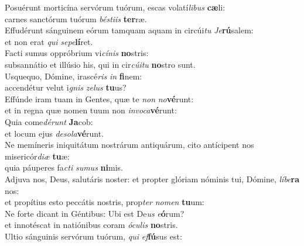 \evenverse Posuérunt morticína servórum tuórum, escas volatí\textit{li}\textit{bus} \textbf{cæ}li:~\*\\
\evenverse carnes sanctórum tuórum \textit{bé}\textit{sti}\textit{is} \textbf{ter}ræ.\\
\oddverse Effudérunt sánguinem eórum tamquam aquam in circúi\textit{tu} \textit{Je}\textbf{rú}salem:~\*\\
\oddverse et non erat \textit{qui} \textit{se}\textit{pe}\textbf{lí}ret.\\
\evenverse Facti sumus oppróbrium vi\textit{cí}\textit{nis} \textbf{no}stris:~\*\\
\evenverse subsannátio et illúsio his, qui in cir\textit{cú}\textit{i}\textit{tu} \textbf{no}stro sunt.\\
\oddverse Usquequo, Dómine, irascé\textit{ris} \textit{in} \textbf{fi}nem:~\*\\
\oddverse accendétur velut i\textit{gnis} \textit{ze}\textit{lus} \textbf{tu}us?\\
\evenverse Effúnde iram tuam in Gentes, quæ te \textit{non} \textit{no}\textbf{vé}runt:~\*\\
\evenverse et in regna quæ nomen tuum non \textit{in}\textit{vo}\textit{ca}\textbf{vé}runt:\\
\oddverse Quia come\textit{dé}\textit{runt} \textbf{Ja}cob:~\*\\
\oddverse et locum ejus \textit{de}\textit{so}\textit{la}\textbf{vé}runt.\\
\evenverse Ne memíneris iniquitátum nostrárum antiquárum, cito antícipent nos misericór\textit{di}\textit{æ} \textbf{tu}æ:~\*\\
\evenverse quia páuperes fa\textit{cti} \textit{su}\textit{mus} \textbf{ni}mis.\\
\oddverse Adjuva nos, Deus, salutáris noster: et propter glóriam nóminis tui, Dómine, \textit{lí}\textit{be}\textbf{ra} nos:~\*\\
\oddverse et propítius esto peccátis nostris, prop\textit{ter} \textit{no}\textit{men} \textbf{tu}um:\\
\evenverse Ne forte dicant in Géntibus: Ubi est De\textit{us} \textit{e}\textbf{ó}rum?~\*\\
\evenverse et innotéscat in natiónibus coram \textit{ó}\textit{cu}\textit{lis} \textbf{no}stris.\\
\oddverse Ultio sánguinis servórum tuórum, \textit{qui} \textit{ef}\textbf{fú}sus est:~\*\\
